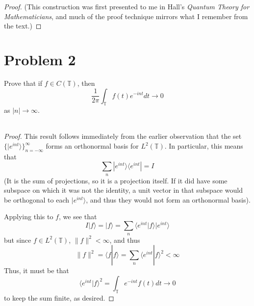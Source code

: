 \documentclass[fontsize=11pt]{scrartcl} %
\numberwithin{equation}{section} %
\numberwithin{figure}{section} %
\numberwithin{table}{section} %
\newcommand{\la}{\langle}
\newcommand{\ra}{\rangle}
\begin{document}
\begin{proof}
    (This construction was first presented to me in Hall's {\em Quantum Theory
        for Mathematicians}, and much of the proof technique mirrors what I
    remember from the text.)
\end{proof}

\newpage

\section*{Problem 2}
Prove that if $f\in C(\mathbb{T})$, then
\[
    \frac{1}{2\pi}\int_{\mathbb{T}}f(t)e^{-int}dt \to 0
\]
as $|n|\to \infty$.
\\
\\
\begin{proof}
    This result follows immediately from the earlier observation that the set
    $\{|e^{int}\ra\}_{n=-\infty}^{\infty}$ forms an orthonormal basis for
    $L^2(\mathbb{T})$. In particular, this means that
    \[
        \sum_n |e^{int}\ra\la e^{int}| = I
    \]
    (It is the sum of projections, so it is a projection itself. If it did have
        some subspace on which it was not the identity, a unit vector in that
        subspace would be orthogonal to each $|e^{int}\ra$, and thus they would
    not form an orthonormal basis).

    Applying this to $f$, we see that
    \[
        I|f\ra = |f\ra = \sum_n \la e^{int}|f\ra|e^{int}\ra
    \]
    but since $f\in L^2(\mathbb{T})$, $\|f\|^2 < \infty$, and thus
    \[
        \|f\|^2 = \la f|f\ra = \sum_n \la e^{int}|f\ra^2 < \infty
    \]
    Thus, it must be that
    \[
        \la e^{int}|f\ra^2 = \int_{\mathbb{T}}e^{-int}f(t)dt \to 0
    \]
    to keep the sum finite, as desired.
\end{proof}

\newpage
\end{document}
